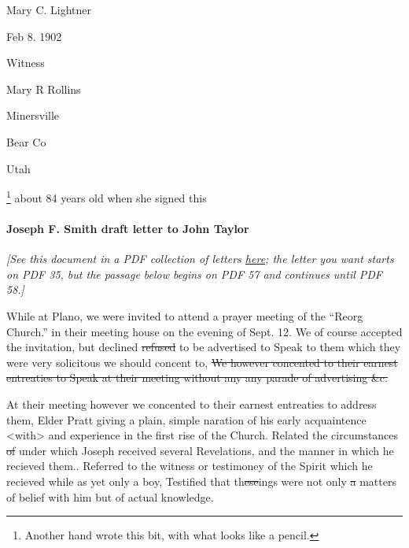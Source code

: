 				Mary C. Lightner
				
				Feb 8. 1902
				
				Witness
				
				\begin{tightright}
					Mary R Rollins
				
					Minersville
					
					Bear Co
					
					Utah
				\end{tightright}
				
					\footnote{%
						Another hand wrote this bit, with what looks like a pencil.
						}%
				about 84 years old when she signed this
				
			\paragraph{Joseph F. Smith draft letter to John Taylor}
			
				\textit{[See this document in a PDF collection of letters \hyperref[https://drive.google.com/file/d/164ar-CWcGvHq5OyM6KGREM2c50yZNaCo/view?usp=share_link]{here}; the letter you want starts on PDF 35, but the passage below begins on PDF 57 and continues until PDF 58.]}
				
				While at Plano, we were invited to attend a prayer meeting of the ``Reorg Church.'' in their meeting house on the evening of Sept. 12. We of course accepted the invitation, but declined \sout{refused} to be advertised to Speak to them which they were very solicitous we should concent to, \sout{We however concented to their earnest entreaties to Speak at their meeting without any any parade of advertising \&c.}

				At their meeting however we concented to their earnest entreaties to address them, Elder Pratt giving a plain, simple naration of his early acquaintence <with> and experience in the first rise of the Church. Related the circumstances \sout{of} under which Joseph received several Revelations, and the manner in which he recieved them.. Referred to the witness or testimoney of the Spirit which he recieved while as yet only a boy, Testified that th\sout{ese}ings were not only \sout{a} matters of belief with him but of actual knowledge.

